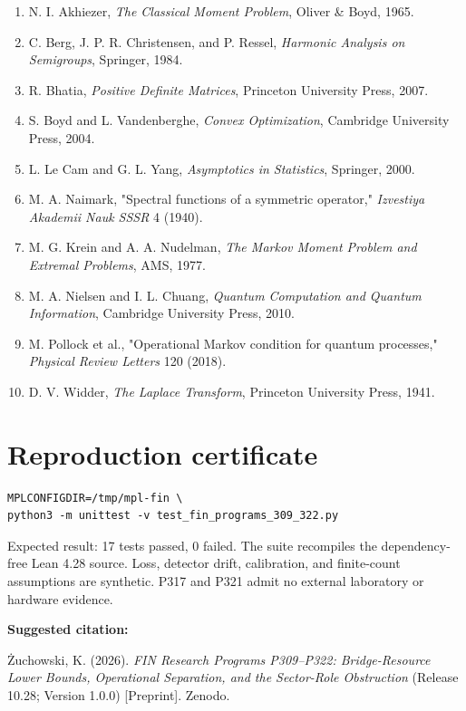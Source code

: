 \documentclass[11pt,a4paper,openany]{report}
\begin{document}
\begin{enumerate}
\item 
N. I. Akhiezer, \emph{The Classical Moment Problem}, Oliver \& Boyd, 1965.

\item 
C. Berg, J. P. R. Christensen, and P. Ressel, \emph{Harmonic Analysis on Semigroups}, Springer, 1984.

\item 
R. Bhatia, \emph{Positive Definite Matrices}, Princeton University Press, 2007.

\item 
S. Boyd and L. Vandenberghe, \emph{Convex Optimization}, Cambridge University Press, 2004.

\item 
L. Le Cam and G. L. Yang, \emph{Asymptotics in Statistics}, Springer, 2000.

\item 
M. A. Naimark, "Spectral functions of a symmetric operator," \emph{Izvestiya Akademii Nauk SSSR} 4 (1940).

\item 
M. G. Krein and A. A. Nudelman, \emph{The Markov Moment Problem and Extremal Problems}, AMS, 1977.

\item 
M. A. Nielsen and I. L. Chuang, \emph{Quantum Computation and Quantum Information}, Cambridge University Press, 2010.

\item 
M. Pollock et al., "Operational Markov condition for quantum processes," \emph{Physical Review Letters} 120 (2018).

\item 
D. V. Widder, \emph{The Laplace Transform}, Princeton University Press, 1941.

\end{enumerate}


\clearpage
\chapter*{Reproduction certificate}
\begin{Verbatim}[fontsize=\small]
MPLCONFIGDIR=/tmp/mpl-fin \
python3 -m unittest -v test_fin_programs_309_322.py
\end{Verbatim}
Expected result: 17 tests passed, 0 failed.  The suite recompiles the
dependency-free Lean 4.28 source.  Loss, detector drift, calibration, and
finite-count assumptions are synthetic.  P317 and P321 admit no external
laboratory or hardware evidence.

\medskip
\noindent\textbf{Suggested citation:}

\.Zuchowski, K. (2026). \emph{FIN Research Programs P309--P322:
Bridge-Resource Lower Bounds, Operational Separation, and the Sector-Role
Obstruction} (Release 10.28; Version 1.0.0) [Preprint]. Zenodo.
\end{document}
